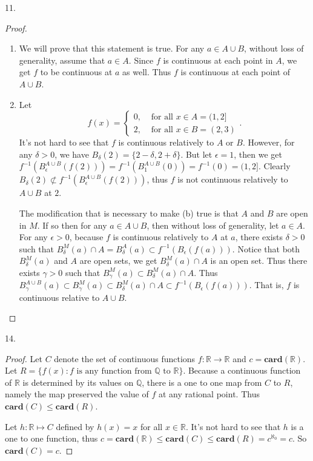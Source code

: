 \documentclass[12pt, a4paper]{article}
\theoremstyle{plain}
\newcommand{\Q}{\mathbb{Q}}
\newcommand{\R}{\mathbb{R}}
\newcommand{\card}{\mathbf{card}}
\begin{document}
11.
\begin{proof}
\hfill
\begin{enumerate}[label=(\alph*)]
\item We will prove that this statement is true. For any $a\in A\cup B$, without loss of generality, assume that $a\in A$. Since $f$ is continuous at each point in $A$, we get $f$ to be continuous at $a$ as well. Thus $f$ is continuous at each point of $A\cup B$.

\item Let 
\[
f(x)=\left\{\begin{array}{lr}
0, &\text{ for all } x\in A=(1,2]\\
2, &\text{ for all } x\in B=(2,3)
\end{array}\right..
\]
It's not hard to see that $f$ is continuous relatively to $A$ or $B$. However, for any $\delta>0$, we have $B_\delta(2)=\{2-\delta,2+\delta\}$. But let $\epsilon = 1$, then we get $f^{-1}(B_\epsilon^{A\cup B}(f(2)))=f^{-1}(B_1^{A\cup B}(0))=f^{-1}(0)=(1,2]$. Clearly $B_\delta(2)\not\subset f^{-1}(B_\epsilon^{A\cup B}(f(2)))$, thus $f$ is not continuous relatively to $A\cup B$ at $2$.

The modification that is necessary to make (b) true is that $A$ and $B$ are open in $M$. If so then for any $a\in A\cup B$, then without loss of generality, let $a\in A$. For any $\epsilon>0$, because $f$ is continuous relatively to $A$ at $a$, there exists $\delta>0$ such that $B_\delta^M(a)\cap A=B_\delta^A(a)\subset f^{-1}(B_\epsilon(f(a)))$. Notice that both $B_\delta^M(a)$ and $A$ are open sets, we get $B_\delta^M(a)\cap A$ is an open set. Thus there exists $\gamma>0$ such that $B_\gamma^M(a)\subset B_\delta^M(a)\cap A$. Thus $B_\gamma^{A\cup B}(a)\subset B_\gamma^M(a)\subset B_\delta^M(a)\cap A\subset f^{-1}(B_\epsilon(f(a)))$. That is, $f$ is continuous relative to $A\cup B$.
\end{enumerate}
\end{proof}

14.
\begin{proof}
Let $C$ denote the set of continuous functions $f:\R\rightarrow\R $ and $c=\card(\R)$. Let $R=\{f(x): f\text{ is any function from }\Q\text{ to }\R\}$. Because a continuous function of $\R$ is determined by its values on $\Q$, there is a one to one map from $C$ to $R$, namely the map preserved the value of $f$ at any rational point. Thus $\card(C)\leq \card(R)$.

Let $h:\R\mapsto C$ defined by $h(x)=x$ for all $x\in \R$. It's not hard to see that $h$ is a one to one function, thus $c=\card(\R)\leq \card(C)\leq \card(R)=c^{\aleph_0}=c$. So $\card(C)=c$. 
\end{proof}
\end{document}
